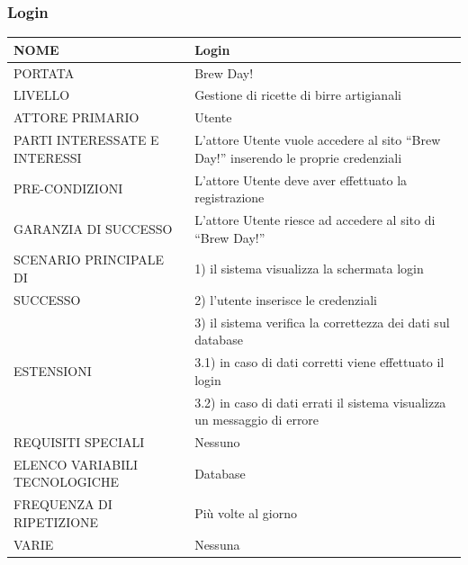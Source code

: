 \documentclass[a4paper, titlepage]{article}
\begin{document}
\subsubsection{Login}
\begin{longtable}{p{6cm}p{7cm}}\toprule
    NOME & Login\\\midrule
    PORTATA & Brew Day!\\\midrule
    LIVELLO & Gestione di ricette di birre artigianali\\\midrule
    ATTORE PRIMARIO & Utente\\\midrule
    PARTI INTERESSATE E INTERESSI & L’attore Utente vuole accedere al sito “Brew Day!” inserendo le proprie credenziali\\\midrule
    PRE-CONDIZIONI & L’attore Utente deve aver effettuato la registrazione\\\midrule
    GARANZIA DI SUCCESSO & L’attore Utente riesce ad accedere al sito di “Brew Day!”\\\midrule
    SCENARIO PRINCIPALE DI
    & 1) il sistema visualizza la schermata login\\
    SUCCESSO & 2) l’utente inserisce le credenziali\\
    & 3) il sistema verifica la correttezza
    dei dati sul database\\\midrule
    ESTENSIONI &
    3.1) in caso di dati corretti viene effettuato il login\\
    & 3.2) in caso di dati errati il sistema
    visualizza un messaggio di errore\\\midrule
    REQUISITI SPECIALI & Nessuno \\\midrule
    ELENCO VARIABILI TECNOLOGICHE & Database\\\midrule
    FREQUENZA DI RIPETIZIONE & Più volte al giorno\\\midrule
    VARIE & Nessuna\\\bottomrule
\end{longtable}
\vphantom{}
\newpage
\end{document}
